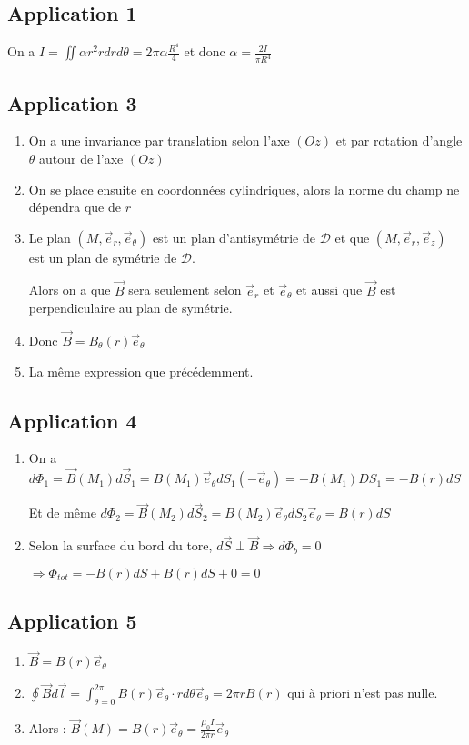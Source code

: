 \documentclass[a4paper,12pt]{book}
\begin{document}
\subsection{Application 1}
On a $I=\iint\alpha r^2rdrd\theta = 2\pi\alpha \frac{R^4}{4}$ et donc $\alpha =\frac{2I}{\pi R^4}$

\subsection{Application 3}
\begin{enumerate}
\item On a une invariance par translation selon l'axe $(Oz)$ et par rotation d'angle $\theta$ autour de l'axe $(Oz)$
\item On se place ensuite en coordonnées cylindriques, alors la norme du champ ne dépendra que de $r$
\item Le plan $(M,\vec{e}_r,\vec{e}_\theta)$ est un plan d'antisymétrie de $\mathcal{D}$ et que $(M,\vec{e}_r,\vec{e}_z)$ est un plan de symétrie de $\mathcal{D}$. \par Alors on a que $\vec{B}$ sera seulement selon $\vec{e}_r$ et $\vec{e}_\theta$ et aussi que $\vec{B}$ est perpendiculaire au plan de symétrie. \item Donc $\vec{B}=B_\theta(r)\vec{e}_\theta$
\item La même expression que précédemment.
\end{enumerate}

\subsection{Application 4}
\begin{enumerate}
\item On a $d\Phi_1=\vec{B}(M_1)d\vec{S}_1=B(M_1)\vec{e}_\theta dS_1(-\vec{e}_\theta) = -B(M_1)DS_1=-B(r)dS$ \par Et de même $d\Phi_2=\vec{B}(M_2)d\vec{S}_2=B(M_2)\vec{e}_\theta dS_2\vec{e}_\theta =B(r)dS$
\item Selon la surface du bord du tore, $d\vec{S}\perp\vec{B}\Rightarrow d\Phi_b=0$ \par $\Rightarrow \Phi_{tot}=-B(r)dS+B(r)dS+0=0$
\end{enumerate}

\subsection{Application 5}
\begin{enumerate}
\item $\vec{B}=B(r)\vec{e}_\theta$
\item $\oint\vec{B}d\vec{l}=\int_{\theta=0}^{2\pi}B(r)\vec{e}_\theta\cdot rd\theta\vec{e}_\theta=2\pi rB(r)$ qui à priori n'est pas nulle.
\item Alors : $\vec{B}(M)=B(r)\vec{e}_\theta=\frac{\mu_0 I}{2\pi r}\vec{e}_\theta$
\end{enumerate}
\end{document}
